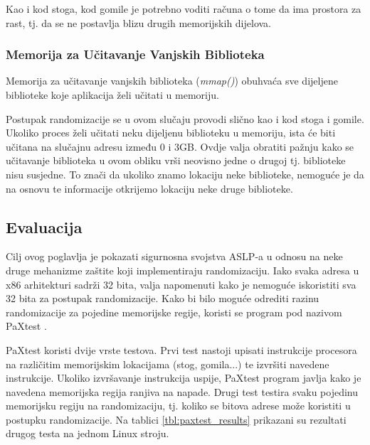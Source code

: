 \documentclass[times, utf8, diplomski, numeric]{fer}
\begin{document}
Kao i kod stoga, kod gomile je potrebno voditi računa o tome da ima prostora za rast, tj. da se ne postavlja blizu drugih memorijskih dijelova.

\subsubsection{Memorija za Učitavanje Vanjskih Biblioteka}
Memorija za učitavanje vanjskih biblioteka (\emph{mmap()}) obuhvaća sve dijeljene biblioteke koje aplikacija želi učitati u memoriju. 

Postupak randomizacije se u ovom slučaju provodi slično kao i kod stoga i gomile. Ukoliko proces želi učitati neku dijeljenu biblioteku u memoriju, ista će biti učitana na slučajnu adresu između 0 i 3GB. Ovdje valja obratiti pažnju kako se učitavanje biblioteka u ovom obliku vrši neovisno jedne o drugoj tj. biblioteke nisu susjedne. To znači da ukoliko znamo lokaciju neke biblioteke, nemoguće je da na osnovu te informacije otkrijemo lokaciju neke druge biblioteke.

\subsection{Evaluacija}
Cilj ovog poglavlja je pokazati sigurnosna svojstva ASLP-a u odnosu na neke druge mehanizme zaštite koji implementiraju randomizaciju. Iako svaka adresa u x86 arhitekturi sadrži 32 bita, valja napomenuti kako je nemoguće iskoristiti sva 32 bita za postupak randomizacije. Kako bi bilo moguće odrediti razinu randomizacije za pojedine memorijske regije, koristi se program pod nazivom PaXtest \citep{pax_test}. 

PaXtest koristi dvije vrste testova. Prvi test nastoji upisati instrukcije procesora na različitim memorijskim lokacijama (stog, gomila...) te izvršiti navedene instrukcije. Ukoliko izvršavanje instrukcija uspije, PaXtest program javlja kako je navedena memorijska regija ranjiva na napade. Drugi test testira svaku pojedinu memorijsku regiju na randomizaciju, tj. koliko se bitova adrese može koristiti u postupku randomizacije. Na tablici \ref{tbl:paxtest_results} prikazani su rezultati drugog testa na jednom Linux stroju.
\end{document}
